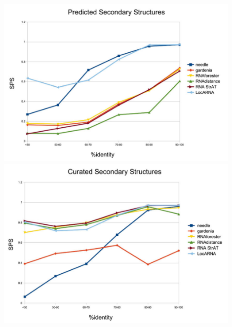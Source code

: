 \documentclass{scrartcl}
\begin{document}
\includegraphics[width=0.9\textwidth]{proseminar/images/predicted} \\
\includegraphics[width=0.9\textwidth]{proseminar/images/curated}
\end{document}
